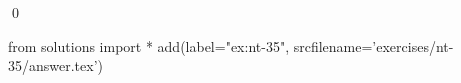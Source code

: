 
\begin{ex} 
  \label{ex:nt-35}
  
  \qed
\end{ex} 
\begin{python0}
from solutions import *
add(label="ex:nt-35",
    srcfilename='exercises/nt-35/answer.tex') 
\end{python0}
